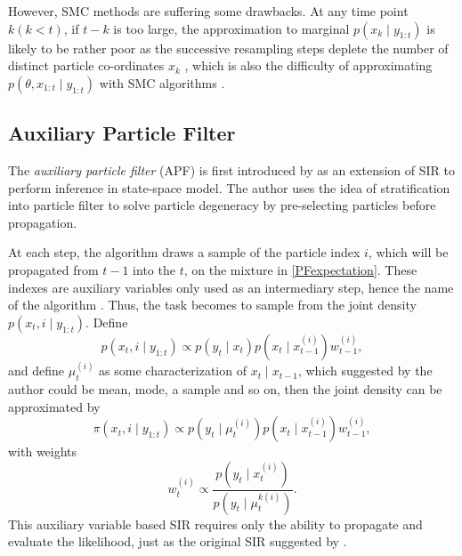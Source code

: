 However, SMC methods are suffering some drawbacks. At any time point $k (k<t)$, if $t-k$ is too large, the approximation to marginal $p(x_k\mid y_{1:t})$ is likely to be rather poor as the successive resampling steps deplete the number of distinct particle co-ordinates $x_k$ \citep{andrieu2010particle}, which is also the difficulty of approximating $p(\theta,x_{1:t}\mid y_{1:t})$ with SMC algorithms 
\citep{andrieu1999sequential, fearnhead2002markov, storvik2002particle}. 




\subsection{Auxiliary Particle Filter}

The \textit{auxiliary particle filter} (APF) is first introduced by \cite{pitt1999filtering} as an extension of SIR to perform inference in state-space model. The author uses the idea of stratification into particle filter to solve particle degeneracy by pre-selecting particles before propagation. 

At each step, the algorithm draws a sample of the particle index $i$, which will be propagated from $t-1$ into the $t$, on the mixture in \eqref{PFexpectation}. These indexes are auxiliary variables only used as an intermediary step, hence the name of the algorithm \citep{pitt1999filtering}. Thus, the task becomes to sample from the joint density $p(x_t,i\mid y_{1:t})$. Define 
\begin{equation}
p(x_t,i\mid y_{1:t})\propto p(y_t\mid x_t)p\left(x_t\mid x_{t-1}^{(i)}\right) w_{t-1}^{(i)}, 
\end{equation}
and define $\mu_t^{(i)}$ as some characterization of $x_t\mid x_{t-1}$, which suggested by the author could be mean, mode, a sample and so on, then the joint density can be approximated by  
\begin{equation}
\pi\left(x_t,i\mid y_{1:t}\right)\propto p\left(y_t\mid \mu_t^{\left(i\right)}\right)p\left(x_t\mid x_{t-1}^{\left(i\right)}\right)w_{t-1}^{\left(i\right)}, 
\end{equation}
with weights
\begin{equation*}
w_t^{\left(i\right)}\propto \frac{ p\left(y_t\mid x_t^{\left(i\right)}\right) }{ p\left(y_t\mid\mu_t^{k\left(i\right)}\right) }.
\end{equation*}
This auxiliary variable based SIR requires only the ability to propagate and evaluate the likelihood, just as the original SIR suggested by \cite{gordon1993novel}.  

